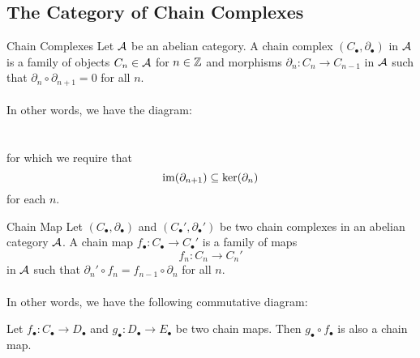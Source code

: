 \documentclass[a4paper]{article}
\begin{document}
\subsection{The Category of Chain Complexes}
\begin{defn}{Chain Complexes}{} Let $\mathcal{A}$ be an abelian category. A chain complex $(C_\bullet,\partial_\bullet)$ in $\mathcal{A}$ is a family of objects $C_n\in\mathcal{A}$ for $n\in\mathbb{Z}$ and morphisms $\partial_n:C_n\to C_{n-1}$ in $\mathcal{A}$ such that $\partial_n\circ\partial_{n+1}=0$ for all $n$. \\~\\
In other words, we have the diagram: \\
\\~\\
for which we require that $$\operatorname{im}(\partial_{n+1})\subseteq\ker(\partial_n)$$ for each $n$. 
\end{defn}

\begin{defn}{Chain Map}{} Let $(C_\bullet,\partial_\bullet)$ and $(C_\bullet',\partial_\bullet')$ be two chain complexes in an abelian category $\mathcal{A}$. A chain map $f_\bullet:C_\bullet\to C_\bullet'$ is a family of maps $$f_n:C_n\to C_n'$$ in $\mathcal{A}$ such that $\partial_n'\circ f_n=f_{n-1}\circ\partial_n$ for all $n$. \\~\\
In other words, we have the following commutative diagram: \\
\end{defn}

\begin{prp}{}{} Let $f_\bullet:C_\bullet\to D_\bullet$ and $g_\bullet:D_\bullet\to E_\bullet$ be two chain maps. Then $g_\bullet\circ f_\bullet$ is also a chain map. \tcbline
\end{prp}
\end{document}

